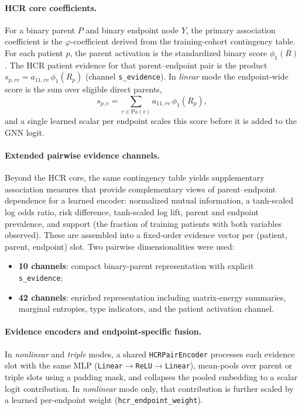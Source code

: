 \paragraph{HCR core coefficients.}
For a binary parent \(P\) and binary endpoint node \(Y\), the primary association
coefficient is the \(\varphi\)-coefficient 
derived from the training-cohort contingency table. For
each patient \(p\), the parent activation is the standardized binary score
\(\phi_1(R)\). The HCR
patient evidence for that parent--endpoint pair is the product
\(s_{p,rv} = a_{11,rv}\,\phi_1(R_p)\) (channel \texttt{s\_evidence}). 
In
\emph{linear} mode the endpoint-wide score is the sum over eligible direct
parents,
\[
  s_{p,v} = \sum_{r \in \mathrm{Pa}(v)} a_{11,rv}\,\phi_1(R_p),
\]
and a single learned scalar per endpoint scales this score before it is
added to the GNN logit. 

\paragraph{Extended pairwise evidence channels.}
Beyond the HCR core, the same contingency table yields supplementary
association measures that
provide complementary views of parent--endpoint dependence for a learned
encoder: normalized mutual information, a tanh-scaled log odds ratio, risk
difference, tanh-scaled log lift, parent and endpoint prevalence, and
support (the fraction of training patients with both variables observed).
These are assembled into a fixed-order evidence vector per
(patient, parent, endpoint) slot. Two pairwise dimensionalities were used:
\begin{itemize}
  \item \textbf{10 channels}: compact
        binary-parent representation with explicit \texttt{s\_evidence};
  \item \textbf{42 channels}:
        enriched representation including matrix-energy summaries, marginal
        entropies, type indicators, and the patient activation channel.
\end{itemize}
\paragraph{Evidence encoders and endpoint-specific fusion.}
In \emph{nonlinear} and \emph{triple} modes, a shared \texttt{HCRPairEncoder}
processes each evidence slot with the same MLP
(\texttt{Linear}$\rightarrow$\texttt{ReLU}$\rightarrow$\texttt{Linear}),
mean-pools over parent or triple slots using a padding mask, and collapses
the pooled embedding to a scalar logit contribution.
In \emph{nonlinear} mode only, that contribution is further scaled by a
learned per-endpoint weight (\texttt{hcr\_endpoint\_weight}).

